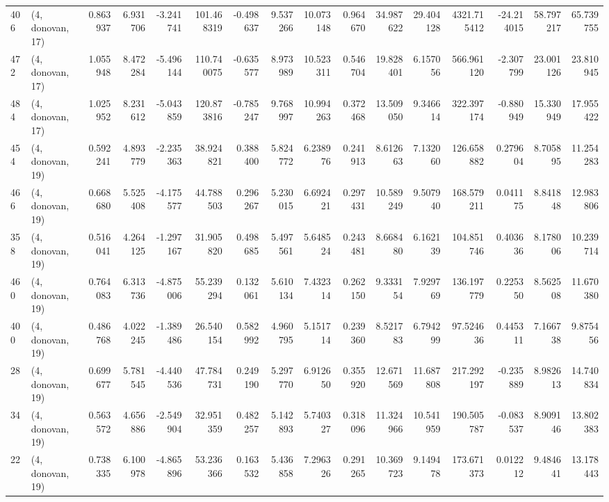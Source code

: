 \begin{tabular}{llrrrrrrrrrrrrrr}
406 &  (4, donovan, 17) &   0.863937 &   6.931706 &  -3.241741 &   101.468319 &  -0.498637 &   9.537266 &  10.073148 &  0.964670 &  34.987622 &  29.404128 &  4321.715412 & -24.214015 &  58.797217 &  65.739755 \\
472 &  (4, donovan, 17) &   1.055948 &   8.472284 &  -5.496144 &   110.740075 &  -0.635577 &   8.973989 &  10.523311 &  0.546704 &  19.828401 &   6.157056 &   566.961120 &  -2.307799 &  23.001126 &  23.810945 \\
484 &  (4, donovan, 17) &   1.025952 &   8.231612 &  -5.043859 &   120.873816 &  -0.785247 &   9.768997 &  10.994263 &  0.372468 &  13.509050 &   9.346614 &   322.397174 &  -0.880949 &  15.330949 &  17.955422 \\
454 &  (4, donovan, 19) &   0.592241 &   4.893779 &  -2.235363 &    38.924821 &   0.388400 &   5.824772 &   6.238976 &  0.241913 &   8.612663 &   7.132060 &   126.658882 &   0.279604 &   8.705895 &  11.254283 \\
466 &  (4, donovan, 19) &   0.668680 &   5.525408 &  -4.175577 &    44.788503 &   0.296267 &   5.230015 &   6.692421 &  0.297431 &  10.589249 &   9.507940 &   168.579211 &   0.041175 &   8.841848 &  12.983806 \\
358 &  (4, donovan, 19) &   0.516041 &   4.264125 &  -1.297167 &    31.905820 &   0.498685 &   5.497561 &   5.648524 &  0.243481 &   8.668480 &   6.162139 &   104.851746 &   0.403636 &   8.178006 &  10.239714 \\
460 &  (4, donovan, 19) &   0.764083 &   6.313736 &  -4.875006 &    55.239294 &   0.132061 &   5.610134 &   7.432314 &  0.262150 &   9.333154 &   7.929769 &   136.197779 &   0.225350 &   8.562508 &  11.670380 \\
400 &  (4, donovan, 19) &   0.486768 &   4.022245 &  -1.389486 &    26.540154 &   0.582992 &   4.960795 &   5.151714 &  0.239360 &   8.521783 &   6.794299 &    97.524636 &   0.445311 &   7.166738 &   9.875456 \\
28  &  (4, donovan, 19) &   0.699677 &   5.781545 &  -4.440536 &    47.784731 &   0.249190 &   5.297770 &   6.912650 &  0.355920 &  12.671569 &  11.687808 &   217.292197 &  -0.235889 &   8.982613 &  14.740834 \\
34  &  (4, donovan, 19) &   0.563572 &   4.656886 &  -2.549904 &    32.951359 &   0.482257 &   5.142893 &   5.740327 &  0.318096 &  11.324966 &  10.541959 &   190.505787 &  -0.083537 &   8.909146 &  13.802383 \\
22  &  (4, donovan, 19) &   0.738335 &   6.100978 &  -4.865896 &    53.236366 &   0.163532 &   5.436858 &   7.296326 &  0.291265 &  10.369723 &   9.149478 &   173.671373 &   0.012212 &   9.484641 &  13.178443 \\

\end{tabular}
